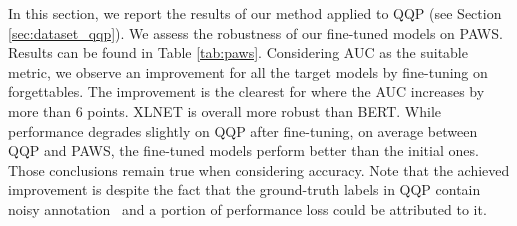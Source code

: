
In this section, we report the results of our method applied to QQP (see Section \ref{sec:dataset_qqp}). We assess the robustness of our fine-tuned models on PAWS. Results can be found in Table \ref{tab:paws}. Considering AUC as the suitable metric, we observe an improvement for all the target models by fine-tuning on forgettables. The improvement is the clearest for \xlnetlarge where the AUC increases by more than 6 points. XLNET is overall more robust than BERT. While performance degrades slightly on QQP after fine-tuning, on average between QQP and PAWS, the fine-tuned models perform better than the initial ones. Those conclusions remain true when considering accuracy. Note that the achieved improvement is despite the fact that the ground-truth labels in QQP contain noisy annotation~\citep{iyer2017first} and a portion of performance loss could be attributed to it.

